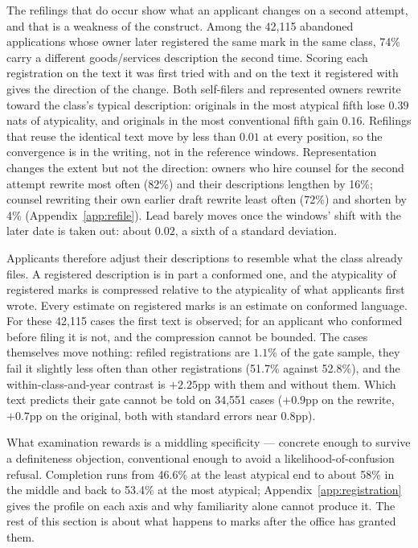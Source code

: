 \documentclass[11pt]{article}
\begin{document}
The refilings that do occur show what an applicant changes on a second
attempt, and that is a weakness of the construct. Among the 42{,}115
abandoned applications whose owner later registered the same mark in the
same class, 74\% carry a different goods/services description the second
time. Scoring each registration on the text it was first tried with and on
the text it registered with gives the direction of the change. Both
self-filers and represented owners rewrite toward the class's typical
description: originals in the most atypical fifth lose $0.39$ nats of
atypicality, and originals in the most conventional fifth gain $0.16$.
Refilings that reuse the identical text move by less than $0.01$ at every
position, so the convergence is in the writing, not in the reference
windows. Representation changes the extent but not the direction: owners
who hire counsel for the second attempt rewrite most often (82\%) and their
descriptions lengthen by 16\%; counsel rewriting their own earlier draft
rewrite least often (72\%) and shorten by 4\%
(Appendix~\ref{app:refile}). Lead barely moves once the windows' shift
with the later date is taken out: about $0.02$, a sixth of a standard
deviation.

Applicants therefore adjust their descriptions to resemble what the class
already files. A registered description is in part a conformed one, and the
atypicality of registered marks is compressed relative to the atypicality of
what applicants first wrote. Every estimate on registered marks is an
estimate on conformed language. For these 42{,}115 cases the first text is
observed; for an applicant who conformed before filing it is not, and the
compression cannot be bounded. The cases themselves move nothing: refiled
registrations are $1.1$\% of the gate sample, they fail it slightly less
often than other registrations (51.7\% against 52.8\%), and the
within-class-and-year contrast is $+2.25$pp with them and without them.
Which text predicts their gate cannot be told on 34{,}551 cases ($+0.9$pp
on the rewrite, $+0.7$pp on the original, both with standard errors near
$0.8$pp).

What examination rewards is a middling specificity --- concrete enough to
survive a definiteness objection, conventional enough to avoid a
likelihood-of-confusion refusal. Completion runs from 46.6\% at the least
atypical end to about 58\% in the middle and back to 53.4\% at the most
atypical; Appendix~\ref{app:registration} gives the profile on each axis and
why familiarity alone cannot produce it. The rest of this section is about what
happens to marks after the office has granted them.
\end{document}
